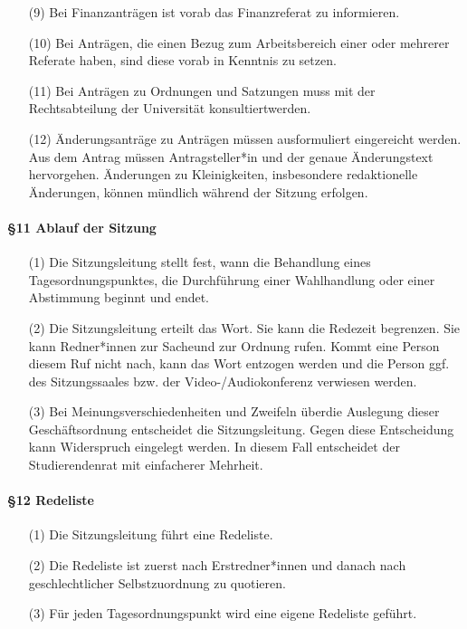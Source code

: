 \begin{itemize}
                \item[(9)] Bei Finanzanträgen ist vorab das Finanzreferat zu informieren.
                \item[(10)] Bei Anträgen, die einen Bezug zum Arbeitsbereich einer oder mehrerer Referate haben, sind diese vorab in Kenntnis zu setzen.
                \item[(11)] Bei Anträgen zu Ordnungen und Satzungen muss mit der Rechtsabteilung der Universität konsultiertwerden.
                \item[(12)] Änderungsanträge zu Anträgen müssen ausformuliert eingereicht werden. Aus dem Antrag müssen Antragsteller*in und der genaue Änderungstext hervorgehen. Änderungen zu Kleinigkeiten, insbesondere redaktionelle Änderungen, können mündlich während der Sitzung erfolgen. 
            \end{itemize}
        \paragraph{§11 Ablauf der Sitzung}
            \begin{itemize}
                \item[(1)] Die Sitzungsleitung stellt fest, wann die Behandlung eines Tagesordnungspunktes, die Durchführung einer Wahlhandlung oder einer Abstimmung beginnt und endet.
                \item[(2)] Die Sitzungsleitung erteilt das Wort. Sie kann die Redezeit begrenzen. Sie kann Redner*innen zur Sacheund zur Ordnung rufen. Kommt eine Person diesem Ruf nicht nach, kann das Wort entzogen werden und die Person ggf. des Sitzungssaales bzw. der Video-/Audiokonferenz verwiesen werden.
                \item[(3)] Bei Meinungsverschiedenheiten und Zweifeln überdie Auslegung dieser Geschäftsordnung entscheidet die Sitzungsleitung. Gegen diese Entscheidung kann Widerspruch eingelegt werden. In diesem Fall entscheidet der Studierendenrat mit einfacherer Mehrheit. 
            \end{itemize}
        \paragraph{§12  Redeliste}
            \begin{itemize}
                \item[(1)] Die Sitzungsleitung führt eine Redeliste.
                \item[(2)] Die Redeliste ist zuerst nach Erstredner*innen und danach nach geschlechtlicher Selbstzuordnung zu quotieren. 
                \item[(3)] Für jeden Tagesordnungspunkt wird eine eigene Redeliste geführt. 
            \end{itemize}
